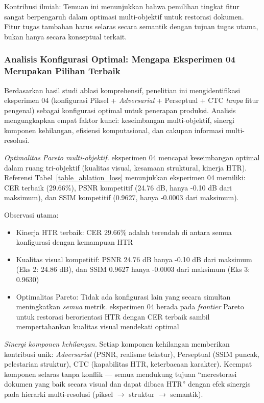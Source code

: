 \documentclass[journal]{IEEEtran}
\begin{document}
Kontribusi ilmiah: Temuan ini menunjukkan bahwa pemilihan tingkat fitur sangat berpengaruh dalam optimasi multi-objektif untuk restorasi dokumen. Fitur tugas tambahan harus selaras secara semantik dengan tujuan tugas utama, bukan hanya secara konseptual terkait.

\subsubsection{Analisis Konfigurasi Optimal: Mengapa Eksperimen 04 Merupakan Pilihan Terbaik}
\label{sec:exp04_optimal}

Berdasarkan hasil studi ablasi komprehensif, penelitian ini mengidentifikasi eksperimen 04 (konfigurasi Piksel + \textit{Adversarial} + Perseptual + CTC \textit{tanpa} fitur pengenal) sebagai konfigurasi optimal untuk penerapan produksi. Analisis mengungkapkan empat faktor kunci: keseimbangan multi-objektif, sinergi komponen kehilangan, efisiensi komputasional, dan cakupan informasi multi-resolusi.

\textit{Optimalitas Pareto multi-objektif.} eksperimen 04 mencapai keseimbangan optimal dalam ruang tri-objektif (kualitas visual, kesamaan struktural, kinerja HTR). Referensi Tabel~\ref{table_ablation_loss} menunjukkan eksperimen 04 memiliki: CER terbaik (29.66\%), PSNR kompetitif (24.76 dB, hanya -0.10 dB dari maksimum), dan SSIM kompetitif (0.9627, hanya -0.0003 dari maksimum).

Observasi utama:
\begin{itemize}
    \item Kinerja HTR terbaik: CER 29.66\% adalah terendah di antara semua konfigurasi dengan kemampuan HTR
    
    \item Kualitas visual kompetitif: PSNR 24.76 dB hanya -0.10 dB dari maksimum (Eks 2: 24.86 dB), dan SSIM 0.9627 hanya -0.0003 dari maksimum (Eks 3: 0.9630)
    
    \item Optimalitas Pareto: Tidak ada konfigurasi lain yang secara simultan meningkatkan \textit{semua} metrik. eksperimen 04 berada pada \textit{frontier} Pareto untuk restorasi berorientasi HTR dengan CER terbaik sambil mempertahankan kualitas visual mendekati optimal
\end{itemize}

\textit{Sinergi komponen kehilangan.} Setiap komponen kehilangan memberikan kontribusi unik: \textit{Adversarial} (PSNR, realisme tekstur), Perseptual (SSIM puncak, pelestarian struktur), CTC (kapabilitas HTR, keterbacaan karakter). Keempat komponen selaras tanpa konflik — semua mendukung tujuan ``merestorasi dokumen yang baik secara visual dan dapat dibaca HTR'' dengan efek sinergis pada hierarki multi-resolusi (piksel $\rightarrow$ struktur $\rightarrow$ semantik).
\end{document}
